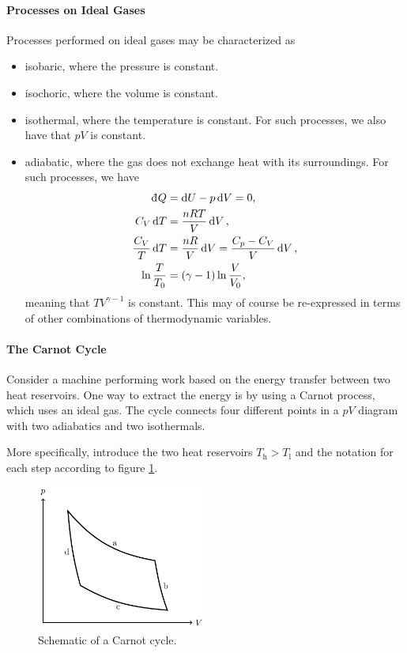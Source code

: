 \paragraph{Processes on Ideal Gases}
Processes performed on ideal gases may be characterized as
\begin{itemize}
	\item isobaric, where the pressure is constant.
	\item isochoric, where the volume is constant.
	\item isothermal, where the temperature is constant. For such processes, we also have that $pV$ is constant.
	\item adiabatic, where the gas does not exchange heat with its surroundings. For such processes, we have
	\begin{align*}
		\din{Q}               &= \dd{U} - p\dd{V} = 0, \\
		C_{V}\dd{T}           &= \frac{nRT}{V}\dd{V}, \\
		\frac{C_{V}}{T}\dd{T} &= \frac{nR}{V}\dd{V} = \frac{C_{p} - C_{V}}{V}\dd{V}, \\
		\ln{\frac{T}{T_{0}}}  &= (\gamma - 1)\ln{\frac{V}{V_{0}}},
	\end{align*}
	meaning that $TV^{\gamma - 1}$ is constant. This may of course be re-expressed in terms of other combinations of thermodynamic variables.
\end{itemize}

\paragraph{The Carnot Cycle}
Consider a machine performing work based on the energy transfer between two heat reservoirs. One way to extract the energy is by using a Carnot process, which uses an ideal gas. The cycle connects four different points in a $pV$ diagram with two adiabatics and two isothermals.

More specifically, introduce the two heat reservoirs $T_{\text{h}} > T_{\text{l}}$ and the notation for each step according to figure \ref{fig:carnot}.
\begin{figure}[!ht]
	\centering
	\includegraphics[width = 0.5\textwidth]{./Images/carnot.pdf}
	\caption{Schematic of a Carnot cycle.}
	\label{fig:carnot}
\end{figure}

